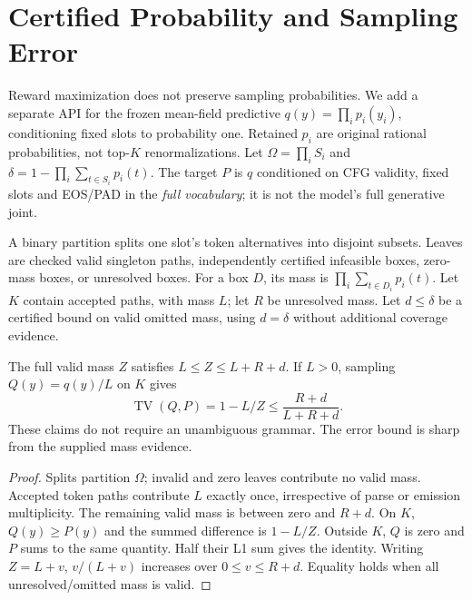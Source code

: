 \section{Certified Probability and Sampling Error}
\label{sec:probability}

Reward maximization does not preserve sampling probabilities. We add a separate
API for the frozen mean-field predictive $q(y)=\prod_i p_i(y_i)$, conditioning
fixed slots to probability one. Retained $p_i$ are original rational probabilities,
not top-$K$ renormalizations. Let $\Omega=\prod_i S_i$ and
$\delta=1-\prod_i\sum_{t\in S_i}p_i(t)$. The target $P$ is $q$ conditioned on
CFG validity, fixed slots and EOS/PAD in the \emph{full vocabulary}; it is not
the model's full generative joint.

A binary partition splits one slot's token alternatives into disjoint subsets.
Leaves are checked valid singleton paths, independently certified infeasible
boxes, zero-mass boxes, or unresolved boxes. For a box $D$, its mass is
$\prod_i\sum_{t\in D_i}p_i(t)$. Let $K$ contain accepted paths, with mass $L$;
let $R$ be unresolved mass. Let $d\leq\delta$ be a certified bound on valid
omitted mass, using $d=\delta$ without additional coverage evidence.

\begin{theorem}
The full valid mass $Z$ satisfies $L\leq Z\leq L+R+d$. If $L>0$, sampling
$Q(y)=q(y)/L$ on $K$ gives
\begin{equation}
 \operatorname{TV}(Q,P)=1-L/Z\leq\frac{R+d}{L+R+d}.
 \label{eq:probability-error}
\end{equation}
These claims do not require an unambiguous grammar. The error bound is sharp
from the supplied mass evidence.
\label{thm:probability-error}
\end{theorem}
\begin{proof}
Splits partition $\Omega$; invalid and zero leaves contribute no valid mass.
Accepted token paths contribute $L$ exactly once, irrespective of parse or
emission multiplicity. The remaining valid mass is between zero and $R+d$.
On $K$, $Q(y)\geq P(y)$ and the summed difference is $1-L/Z$. Outside $K$,
$Q$ is zero and $P$ sums to the same quantity. Half their L1 sum gives the
identity. Writing $Z=L+v$, $v/(L+v)$ increases over $0\leq v\leq R+d$.
Equality holds when all unresolved/omitted mass is valid.
\end{proof}

